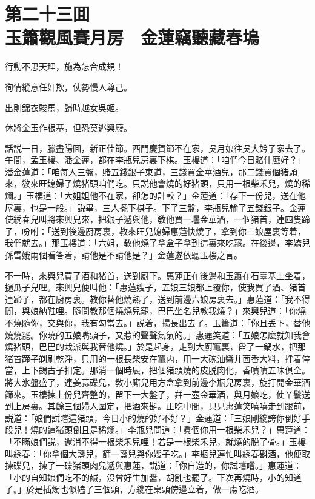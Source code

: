 
\chapter*{第二十三囬　\\玉簫觀風賽月房　金蓮竊聽藏春塢}


\begin{myquote}
行動不思天理，施為怎合成規！

徇情縱意任奸欺，仗勢慢人尊己。

出則錦衣駿馬，歸時越女吳姬。

休將金玉作根基，但恐莫逃興廢。
\end{myquote}

話説一日，臘盡陽囬，新正佳節。西門慶賀節不在家，吳月娘往吳大妗子家去了。午間，孟玉樓、潘金蓮，都在李瓶兒房裏下棋。玉樓道：「咱們今日賭什麽好？」潘金蓮道：「咱每人三盤，賭五錢銀子東道，三錢買金華酒兒，那二錢買個猪頭來，敎來旺媳婦子燒猪頭咱們吃。只説他會燒的好猪頭，只用一根柴禾兒，燒的稀爛。」玉樓道：「大姐姐他不在家，卻怎的計較？」金蓮道：「存下一份兒，送在他屋裏，也是一般。」説畢，三人擺下棋子。下了三盤，李瓶兒輸了五錢銀子。金蓮使綉春兒叫將來興兒來，把銀子遞與他，敎他買一壜金華酒，一個猪首，連四隻蹄子，吩咐：「送到後邊廚房裏，教來旺兒媳婦惠蓮快燒了，拿到你三娘屋裏等着，我們就去。」那玉樓道：「六姐，敎他燒了拿盒子拿到這裏來吃罷。在後邊，李嬌兒孫雪娥兩個看答着，請他是不請他是？」金蓮遂依聽玉樓之言。

不一時，來興兒買了酒和猪首，送到廚下。惠蓮正在後邊和玉簫在石臺基上坐着，撾瓜子兒哩。來興兒便叫他：「惠蓮嫂子，五娘三娘都上覆你，使我買了酒、猪首連蹄子，都在廚房裏。教你替他燒熟了，送到前邊六娘房裏去。」惠蓮道：「我不得閒，與娘納鞋哩。隨問教那個燒燒兒罷，巴巴坐名兒教我燒？」來興兒道：「你燒不燒隨你，交與你，我有勾當去。」説着，揚長出去了。玉簫道：「你且丢下，替他燒燒罷。你曉的五娘嘴頭子，又惹的聲聲氣氣的。」惠蓮笑道：「五娘怎麽就知我會燒猪頭，巴巴的栽派與我替他燒。」於是起身，走到大廚竃裏，舀了一鍋水，把那猪首蹄子剃刷乾淨，只用的一根長柴安在竃内，用一大碗油醬并茴香大料，拌着停當，上下錫古子扣定。那消一個時辰，把個猪頭燒的皮脱肉化，香噴噴五味俱全。將大氷盤盛了，連姜蒜碟兒，敎小廝兒用方盒拿到前邊李瓶兒房裏，旋打開金華酒篩來。玉樓揀上份兒齊整的，㽞下一大盤子，幷一壺金華酒，與月娘吃，使丫鬟送到上房裏。其餘三個婦人圍定，把酒來斟。正吃中間，只見惠蓮笑嘻嘻走到跟前，説道：「娘們試嚐這猪頭，今日小的燒的好不好？」金蓮道：「三娘剛纔誇你倒好手段兒！燒的這猪頭倒且是稀爛。」李瓶兒問道：「眞個你用一根柴禾兒？」惠蓮道：「不瞞娘們説，還消不得一根柴禾兒哩！若是一根柴禾兒，就燒的脱了骨。」玉樓叫綉春：「你拿個大盞兒，篩一盞兒與你嫂子吃。」李瓶兒連忙叫綉春斟酒，他便取揀碟兒，揀了一碟猪頭肉兒遞與惠蓮，説道：「你自造的，你試嚐嚐。」惠蓮道：「小的自知娘們吃不的鹹，沒曾好生加醬，胡亂也罷了。下次再燒時，小的知道了。」於是插燭也似磕了三個頭，方纔在桌頭傍邊立着，做一䖏吃酒。


